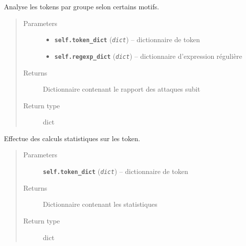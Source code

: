 \documentclass[letterpaper,10pt,english]{sphinxmanual}
\begin{document}
\begin{fulllineitems}
\begin{fulllineitems}
\label{loganalyser:loganalyser.diagnostique.Diagnostique._Diagnostique__analyse}
Analyse les tokens par groupe selon certains motifs.
\begin{quote}\begin{description}
\item[{Parameters}] \leavevmode\begin{itemize}
\item {} 
\textbf{\texttt{self.token\_dict}} (\emph{\texttt{dict}}) -- dictionnaire de token

\item {} 
\textbf{\texttt{self.regexp\_dict}} (\emph{\texttt{dict}}) -- dictionnaire d'expression régulière

\end{itemize}

\item[{Returns}] \leavevmode
Dictionnaire contenant le rapport des attaques subit

\item[{Return type}] \leavevmode
dict

\end{description}\end{quote}

\end{fulllineitems}


\begin{fulllineitems}
\label{loganalyser:loganalyser.diagnostique.Diagnostique._Diagnostique__statistique}
Effectue des calculs statistiques sur les token.
\begin{quote}\begin{description}
\item[{Parameters}] \leavevmode
\textbf{\texttt{self.token\_dict}} (\emph{\texttt{dict}}) -- dictionnaire de token

\item[{Returns}] \leavevmode
Dictionnaire contenant les statistiques

\item[{Return type}] \leavevmode
dict

\end{description}\end{quote}

\end{fulllineitems}


\end{fulllineitems}
\end{document}
